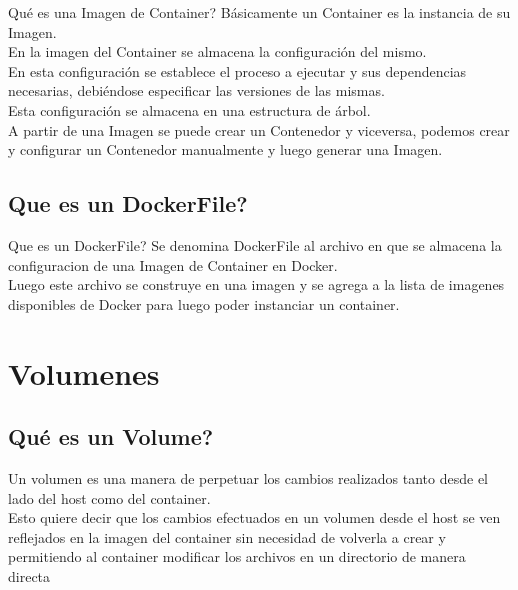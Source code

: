 \documentclass{beamer}
\begin{document}
\begin{frame}{Qué es una Imagen de Container?}
 	Básicamente un Container es la instancia de su Imagen.\\
	En la imagen del Container se almacena la configuración del mismo.\\
	En esta configuración se establece el proceso a ejecutar y sus dependencias necesarias, debiéndose especificar las versiones de las mismas. \\
	Esta configuración se almacena en una estructura de árbol.\\
	A partir de una Imagen se puede crear un Contenedor y viceversa, podemos crear y configurar un Contenedor manualmente y luego generar una Imagen. \\
\end{frame}

\subsection{Que es un DockerFile?}
\begin{frame}{Que es un DockerFile?}
	Se denomina DockerFile al archivo en que se almacena la configuracion de una Imagen de Container en Docker. \\
	Luego este archivo se construye en una imagen y se agrega a la lista de imagenes disponibles de Docker para luego poder instanciar un container. \\
\end{frame}

\section{Volumenes}

\subsection{Qué es un Volume?}

\begin{frame}
	Un volumen es una manera de perpetuar los cambios realizados tanto desde el lado del host como del container.\\
	\vspace{.3cm}
	Esto quiere decir que los cambios efectuados en un volumen desde el host se ven reflejados en la imagen del container
	sin necesidad de volverla a crear y permitiendo al container modificar los archivos en un directorio de manera directa\\
\end{frame}
\end{document}
